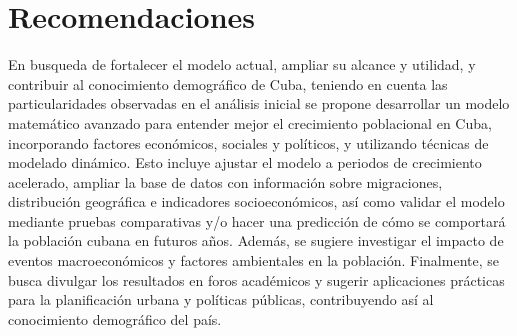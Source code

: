 \documentclass[a4paper,10pt,twocolumn]{article}
\begin{document}
	\section{Recomendaciones}\label{sec:outro}	
	\normalsize{En busqueda de fortalecer el modelo actual, ampliar su alcance y utilidad, y contribuir al conocimiento demográfico de Cuba, teniendo en cuenta las particularidades observadas en el análisis inicial se propone desarrollar un modelo matemático avanzado para entender mejor el crecimiento poblacional en Cuba, incorporando factores económicos, sociales y políticos, y utilizando técnicas de modelado dinámico. Esto incluye ajustar el modelo a periodos de crecimiento acelerado, ampliar la base de datos con información sobre migraciones, distribución geográfica e indicadores socioeconómicos, así como validar el modelo mediante pruebas comparativas y/o hacer una predicción de cómo se comportará la población cubana en futuros años. Además, se sugiere investigar el impacto de eventos macroeconómicos y factores ambientales en la población. Finalmente, se busca divulgar los resultados en foros académicos y sugerir aplicaciones prácticas para la planificación urbana y políticas públicas, contribuyendo así al conocimiento demográfico del país.}
\end{document}
